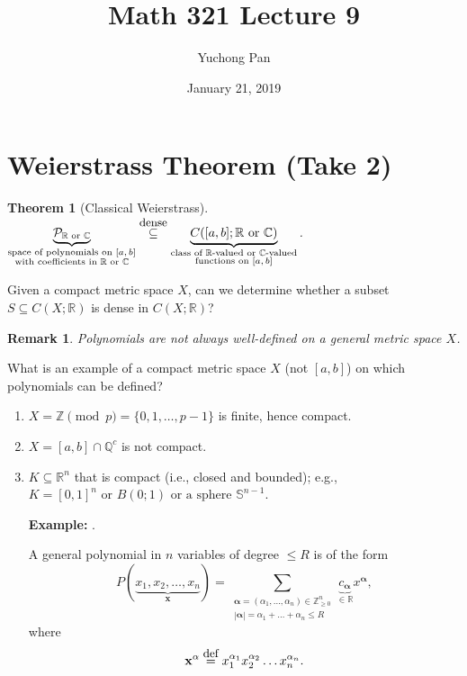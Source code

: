 \documentclass[letterpaper, reqno,11pt]{article}
\newcommand{\RR}{\mathbb{R}}
\newcommand{\CC}{\mathbb{C}}
\newcommand{\ZZ}{\mathbb{Z}}
\newcommand{\QQ}{\mathbb{Q}}
\begin{document}
\title{Math 321 Lecture 9}
\author{Yuchong Pan}
\date{January 21, 2019}
\newtheorem{thm}{Theorem}
\newtheorem{defn}{Definition}
\newtheorem*{remark}{Remark}
\newtheorem{claim}{Claim}
\newtheorem{cor}{Corollary}
\newtheorem{lemma}{Lemma}
\maketitle
%

\section{Weierstrass Theorem (Take 2)}

\begin{thm}[Classical Weierstrass]
  \normalfont $\underbrace{\mathcal P_{\RR \text{ or } \CC}}_{\substack{\text{space of polynomials on $[a, b]$} \\ \text{with coefficients in $\RR$ or $\CC$}}} \overset{\text{\small dense}}{\subseteq} \underbrace{C([a, b]; \RR \text{ or } \CC)}_{\substack{\text{class of $\RR$-valued or $\CC$-valued} \\ \text{functions on $[a, b]$}}}$.
\end{thm}

 Given a compact metric space $X$, can we determine whether a subset $S \subseteq C(X; \RR)$ is dense in $C(X; \RR)$?

\begin{remark}
  \normalfont Polynomials are not always well-defined on a general metric space $X$.
\end{remark}

 What is an example of a compact metric space $X$ (not $[a, b]$) on which polynomials can be defined?
\begin{enumerate}
\item $X = \ZZ \pmod p = \{ 0, 1, \ldots, p - 1 \}$ is finite, hence compact.
\item $X = [a, b] \cap \QQ^c$ is not compact.
\item $K \subseteq \RR^n$ that is compact (i.e., closed and bounded); e.g., $K = [0, 1]^n \text{ or } B(0; 1) \text{ or a sphere } \mathbb S^{n - 1}$.

  {\bf Example:} .

  A general polynomial in $n$ variables of degree $\leq R$ is of the form
  $$ P(\underbrace{x_1, x_2, \ldots, x_n}_{\mathbf x}) = \sum_{\substack{\mathbf \alpha = (\alpha_1, \ldots, \alpha_n) \in \ZZ_{\geq 0}^n \\ |\mathbf \alpha| = \alpha_1 + \ldots + \alpha_n \leq R}} \underbrace{c_{\mathbf \alpha}}_{\in \RR} x^{\mathbf \alpha}, $$
  where
  $$ \mathbf x^{\mathbf \alpha} \overset{\text{\small def}}{=} x_1^{\alpha_1} x_2^{\alpha_2} \ldots x_n^{\alpha_n}. $$
\end{enumerate}
\end{document}
